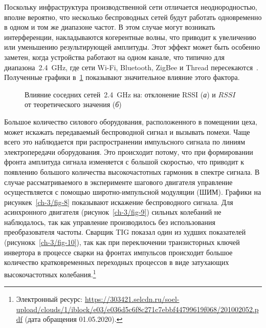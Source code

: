 Поскольку инфраструктура производственной сети отличается неоднородностью, вполне вероятно, что несколько беспроводных сетей будут работать одновременно в одном и том же диапазоне частот. В этом случае могут возникать интерференции, накладываются когерентные волны, что приводит к увеличению или уменьшению результирующей амплитуды. Этот эффект может быть особенно заметен, когда устройства работают на одном канале, что типично для диапазона~\SI{2,4}{\giga \hertz}, где сети Wi-Fi, Bluetooth, ZigBee и Thread пересекаются~\cite{016461}. Полученные графики в~\cref{ch-3/fig-7} показывают значительное влияние этого фактора.

\begin{figure} [htb]
	\caption[Влияние соседних сетей~\SI{2,4}{\giga \hertz} на: отклонение RSSI и $RSSI$ от теоретического значения]
	{Влияние соседних сетей~\SI{2,4}{\giga \hertz} на: отклонение RSSI (\textit{а}) и $RSSI$ от теоретического значения (\textit{б})}
	\label{ch-3/fig-7}
\end{figure}

Большое количество силового оборудования, расположенного в помещении цеха, может искажать передаваемый беспроводной сигнал и вызывать помехи. Чаще всего это наблюдается при распространении импульсного сигнала по линиям электропередачи оборудования. Это происходит потому, что при формировании фронта амплитуда сигнала изменяется с большой скоростью, что приводит к появлению большого количества высокочастотных гармоник в спектре сигнала. В случае рассматриваемого в эксперименте шагового двигателя управление осуществляется с помощью широтно-импульсной модуляции (ШИМ). Графики на рисункек~\cref{ch-3/fig-8} показывают искажение беспроводного сигнала. Для асинхронного двигателя (рисунок~\cref{ch-3/fig-9}) сильных колебаний не наблюдалось, так как управление производилось без использования преобразователя частоты. Сварщик TIG показал один из худших показателей (рисунокк~\cref{ch-3/fig-10}), так как при переключении транзисторных ключей инвертора в процессе сварки на фронтах импульсов происходит большое количество кратковременных переходных процессов в виде затухающих высокочастотных колебания.\footnote{Электронный ресурс: {\tiny\url{https://303421.selcdn.ru/soel-upload/clouds/1/iblock/e03/e036d5c6f8c271c7ebbf44799619f068/201002052.pdf}} (дата обращения 01.05.2020).}

